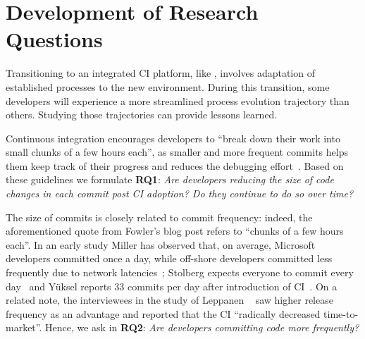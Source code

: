 
\section{Development of Research Questions}
\label{sec:background}

Transitioning to an integrated CI platform, like \Tvi, involves adaptation 
of established processes to the new environment. 
During this transition, some developers will experience a more streamlined 
process evolution trajectory than others. 
Studying those trajectories can provide lessons learned.


%

Continuous integration encourages developers to ``break down their work 
into small chunks of a few hours each'', as smaller and more frequent commits 
helps them keep track of their progress and reduces the debugging effort~\cite{Fowler,Duvall}. 
Based on these guidelines we formulate \textbf{RQ1}: 
\emph{Are developers reducing the size of code changes in each commit 
post CI adoption? 
Do they continue to do so over time?}

The size of commits is closely related to commit frequency: indeed, the 
aforementioned quote from Fowler's blog post refers to ``chunks of a few hours each''. 
In an early study Miller has observed that, on average, Microsoft developers 
committed once a day, while off-shore developers committed less frequently 
due to network latencies~\cite{Miller}; Stolberg expects everyone to commit every 
day~\cite{Stolberg} and Y\"{u}ksel reports 33 commits per day after introduction 
of CI~\cite{Yuksel}. On a related note, the interviewees in the study of 
Leppanen \etal~\cite{Leppanen2015} saw higher release frequency as an
advantage and reported that the CI ``radically decreased time-to-market''. 
Hence, we ask in \textbf{RQ2}: 
\emph{Are developers committing code more frequently?}

